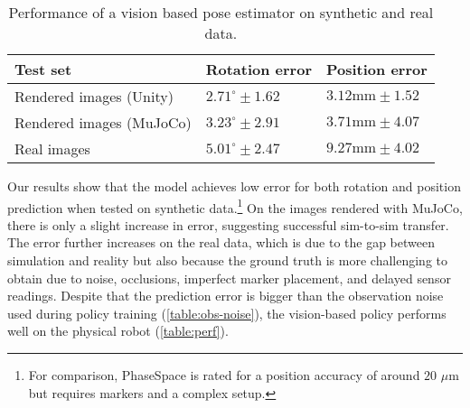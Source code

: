 \begin{table}[h]
    \caption{Performance of a vision based pose estimator on synthetic and real data.}
    \centering
    \renewcommand{\arraystretch}{1.3}
    \begin{tabular}{@{}lll@{}}
        \toprule
        \textbf{Test set} & \textbf{Rotation error} & \textbf{Position error} \\ %
        \midrule
        Rendered images (Unity) & $2.71^{\circ} \pm 1.62$ & $3.12\text{mm} \pm 1.52$ \\
        Rendered images (MuJoCo) & $3.23^{\circ} \pm 2.91$ & $3.71\text{mm} \pm 4.07$ \\
        Real images & $5.01^{\circ} \pm 2.47$ & $9.27\text{mm} \pm 4.02$ \\
    \bottomrule\end{tabular}
    \label{table:vision}
\end{table}

Our results show that the model achieves low error for both rotation and position prediction when tested on synthetic data.\footnote{For comparison, PhaseSpace is rated for a position accuracy of around $20$ $\mu$m but requires markers and a complex setup.}
On the images rendered with MuJoCo, there is only a slight increase in error, suggesting successful sim-to-sim transfer.
The error further increases on the real data, which is due to the gap between simulation and reality but also because the ground truth is more challenging to obtain due to noise, occlusions, imperfect marker placement, and delayed sensor readings.
Despite that the prediction error is bigger than the observation noise used during policy training (\autoref{table:obs-noise}), the vision-based policy performs well
on the physical robot (\autoref{table:perf}).








